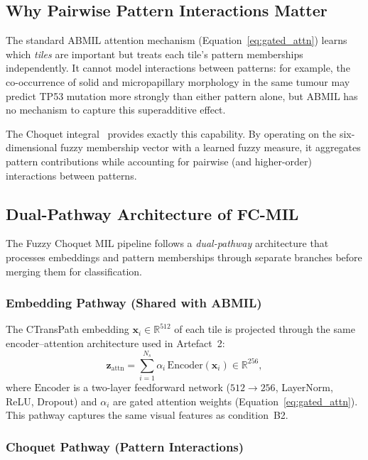 \subsection{Why Pairwise Pattern Interactions Matter}
\label{sec:meth:choquet:motivation}

The standard ABMIL attention mechanism (Equation~\ref{eq:gated_attn}) learns which \emph{tiles} are important but treats each tile's pattern memberships independently.
It cannot model interactions between patterns: for example, the co-occurrence of solid and micropapillary morphology in the same tumour may predict TP53 mutation more strongly than either pattern alone, but ABMIL has no mechanism to capture this superadditive effect.

The Choquet integral~\cite{choquet1954theory,grabisch2009aggregation} provides exactly this capability.
By operating on the six-dimensional fuzzy membership vector with a learned fuzzy measure, it aggregates pattern contributions while accounting for pairwise (and higher-order) interactions between patterns.

\subsection{Dual-Pathway Architecture of FC-MIL}
\label{sec:meth:choquet:architecture}

The Fuzzy Choquet MIL pipeline follows a \emph{dual-pathway} architecture
that processes embeddings and pattern memberships through separate branches
before merging them for classification.

\subsubsection{Embedding Pathway (Shared with ABMIL)}

The CTransPath embedding $\mathbf{x}_i \in \mathbb{R}^{512}$ of each tile
is projected through the same encoder--attention architecture used in
Artefact~2:
\begin{equation}
\label{eq:choquet_emb_path}
\mathbf{z}_{\text{attn}} = \sum_{i=1}^{N_s} \alpha_i \, \text{Encoder}(\mathbf{x}_i) \in \mathbb{R}^{256},
\end{equation}
where $\text{Encoder}$ is a two-layer feedforward network
($512 \to 256$, LayerNorm, ReLU, Dropout) and $\alpha_i$ are gated
attention weights (Equation~\ref{eq:gated_attn}).
This pathway captures the same visual features as condition~B2.

\subsubsection{Choquet Pathway (Pattern Interactions)}

